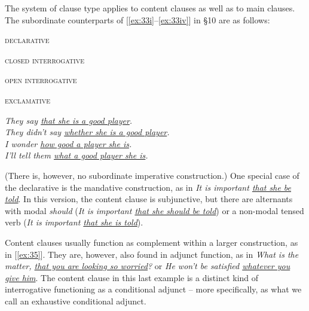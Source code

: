 The system of clause type applies to content clauses as well as to main clauses. The subordinate counterparts of [\ref{ex:33i}--\ref{ex:33iv}] in §10 are as follows:
\begin{examples}
    \item \label{ex:35}
    \begin{minipage}[t]{0.4\linewidth}\vspace{-6pt}
        \begin{examples}
            \item\textsc{declarative}
            \item\textsc{closed interrogative}
            \item\textsc{open interrogative}
            \item\textsc{exclamative}
        \end{examples}
    \end{minipage}
    \begin{minipage}[t]{0.6\linewidth}
        \textit{They say \uline{that she is a good player}.}\\
        \textit{They didn't say \uline{whether she is a good player}.}\\
        \textit{I wonder \uline{how good a player she is}.}\\
        \textit{I'll tell them \uline{what a good player she is}.}
    \end{minipage}
\end{examples}
(There is, however, no subordinate imperative construction.) One special case of the declarative is the {mandative} construction, as in \textit{It is important \uline{that she be told}}. In this version, the content clause is subjunctive, but there are alternants with modal \textit{should} (\textit{It is important \uline{that she should be told}}) or a non-modal tensed verb (\textit{It is important \uline{that she is told}}).

Content clauses usually function as complement within a larger construction, as in [\ref{ex:35}]. They are, however, also found in adjunct function, as in \textit{What is the matter, \uline{that you are looking so worried}?} or \textit{He won't be satisfied \uline{whatever you give him}}. The content clause in this last example is a distinct kind of interrogative functioning as a conditional adjunct -- more specifically, as what we call an {exhaustive conditional adjunct}.

\newpage

